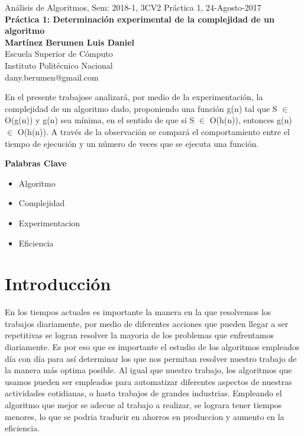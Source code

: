 \documentclass[spanish]{article}
\begin{document}
	\setmarginsrb{30mm}{30mm}{30mm}{30mm}{0pt}{0mm}{0pt}{0mm}
	
	\begin{center}
	{\Large Análisis de Algoritmos, Sem: 2018-1, 3CV2 Práctica 1, 24-Agosto-2017}\\
{\huge {\bf Práctica 1: Determinación experimental de
la complejidad de un algoritmo}} \\
{\large {\bf Martínez Berumen Luis Daniel}\\
Escuela Superior de Cómputo \\
Instituto Politécnico Nacional}\\
dany.berumen@gmail.com\\	
	\end{center}
	\bigskip
	
	\bigskip
	
	\bigskip
En el presente trabajose analizará, por medio de  la
 experimentación, la complejidad de un  algoritmo dado,  proponiendo  una 
función g(n) tal que S $\in$ O(g(n)) y g(n) sea mínima, en el sentido 
de que si S $\in$ O(h(n)), entonces g(n) $\in$ O(h(n)). 
A través de la observación se compará el  comportamiento entre 
el tiempo de ejecución y un número de veces que se ejecuta una función.
\bigskip


	{\Large {\bf Palabras Clave}}\\
	\begin{itemize}
		\item Algoritmo
		\item Complejidad
		\item Experimentacion
		\item Eficiencia
	\end{itemize}
	\bigskip
	
	\section{Introducci\'on}
	En los tiempos actuales es importante la manera en la que resolvemos los trabajos diariamente, por medio de diferentes acciones que pueden llegar a ser repetitivas se logran resolver la mayoria de los problemas que enfrentamos diariamente.
	Es por eso que es importante el estudio de los algoritmos empleados día con día para así determinar los que nos permitan resolver nuestro trabajo de la manera más optima posible.
	Al igual que nuestro trabajo, los algoritmos que usamos pueden ser empleados para automatizar diferentes aspectos de nuestras actividades cotidianas, o hasta trabajos de grandes industrias. 
	Empleando el algoritmo que mejor se adecue al trabajo a realizar, se lograra tener tiempos menores, lo que se podria traducir en ahorros en produccion y aumento en la eficiencia.
	\bigskip
\newpage
\end{document}
